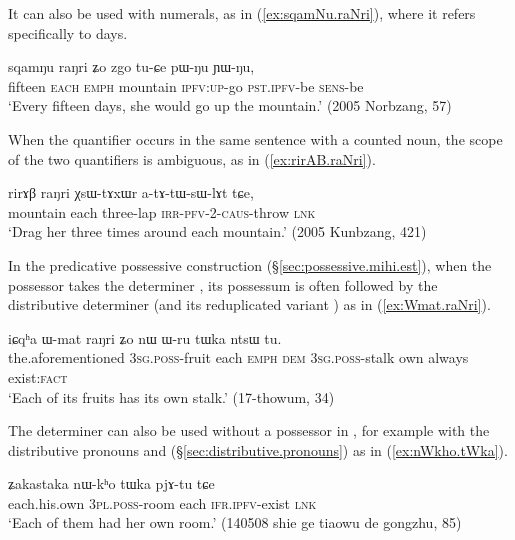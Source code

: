  It can also be used with numerals, as in (\ref{ex:sqamNu.raNri}), where it refers specifically to days.

 \begin{exe}
\ex \label{ex:sqamNu.raNri}
\gll  sqamŋu raŋri ʑo zgo tu-ɕe pɯ-ŋu ɲɯ-ŋu, \\
fifteen \textsc{each} \textsc{emph} mountain \textsc{ipfv}:\textsc{up}-go \textsc{pst}.\textsc{ipfv}-be \textsc{sens}-be \\
\glt `Every fifteen days, she would go up the mountain.' (2005 Norbzang, 57)
  \end{exe}

When the quantifier  occurs in the same sentence with a counted noun, the scope of the two quantifiers is ambiguous, as in (\ref{ex:rirAB.raNri}).

\begin{exe}
\ex \label{ex:rirAB.raNri}
\gll rirɤβ raŋri χsɯ-tɤxɯr a-tɤ-tɯ-sɯ-lɤt tɕe, \\
mountain each three-lap \textsc{irr}-\textsc{pfv}-2-\textsc{caus}-throw \textsc{lnk} \\
\glt `Drag her three times around each mountain.' (2005 Kunbzang, 421)
 \end{exe}
 
In the predicative possessive construction (§\ref{sec:possessive.mihi.est}), when the possessor takes the determiner , its possessum is often  followed by the distributive determiner  (and its reduplicated variant ) as in (\ref{ex:Wmat.raNri}).
 
  \begin{exe}
\ex \label{ex:Wmat.raNri}
\gll   iɕqʰa ɯ-mat raŋri ʑo nɯ ɯ-ru tɯka ntsɯ tu. \\
the.aforementioned \textsc{3sg}.\textsc{poss}-fruit each \textsc{emph} \textsc{dem} \textsc{3sg}.\textsc{poss}-stalk own always exist:\textsc{fact} \\
\glt `Each of its fruits has its own stalk.' (17-thowum, 34)
  \end{exe}
  
The  determiner  can also be used without a possessor in , for example with the distributive pronouns  and  (§\ref{sec:distributive.pronouns})  as in (\ref{ex:nWkho.tWka}).

   \begin{exe}
\ex \label{ex:nWkho.tWka}
\gll   ʑakastaka nɯ-kʰo tɯka pjɤ-tu tɕe \\
each.his.own \textsc{3pl}.\textsc{poss}-room each \textsc{ifr}.\textsc{ipfv}-exist \textsc{lnk} \\
\glt `Each of them had her own room.' (140508 shie ge tiaowu de gongzhu, 85)
   \end{exe}
   
